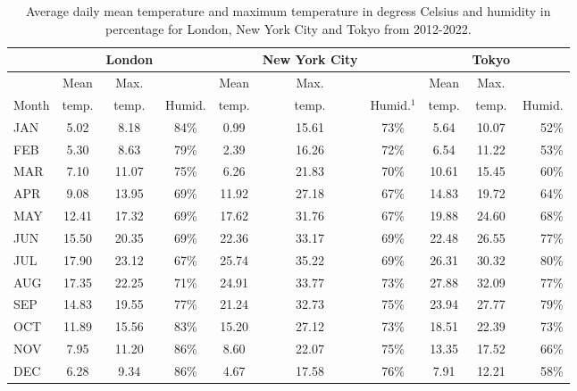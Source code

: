 \begin{table}[H]
\begin{adjustwidth}{-1in}{-1in} %
\small
\centering
\begin{tabular}{lccccccccr}
\toprule
{}  &  {} &  London &  {}  & {}  &  New York City  &  {}  & {}  &  Tokyo  & {}\\
\midrule
\multicolumn{1}{c|}{} &  Mean &  Max. &  \multicolumn{1}{c|}{} &  Mean &  Max. &  \multicolumn{1}{c|}{} &   Mean  &   Max. &  {} \\
\multicolumn{1}{c|}{Month} &  temp. &  temp. &  \multicolumn{1}{c|}{Humid.} &  temp. &  temp. &  \multicolumn{1}{c|}{Humid.$^1$} &   temp. &  temp. &  Humid. \\
\midrule
JAN &    5.02 &        8.18 &        84\% &    0.99 &      15.61 &      73\% &   5.64 &     10.07 &      52\% \\
FEB &    5.30 &        8.63 &        79\% &    2.39 &      16.26 &      72\% &   6.54 &     11.22 &      53\% \\
MAR &    7.10 &       11.07 &        75\% &    6.26 &      21.83 &      70\% &  10.61 &     15.45 &      60\% \\
APR &    9.08 &       13.95 &        69\% &   11.92 &      27.18 &      67\% &  14.83 &     19.72 &      64\% \\
MAY &   12.41 &       17.32 &        69\% &   17.62 &      31.76 &      67\% &  19.88 &     24.60 &      68\% \\
JUN &   15.50 &       20.35 &        69\% &   22.36 &      33.17 &      69\% &  22.48 &     26.55 &      77\% \\
JUL &   17.90 &       23.12 &        67\% &   25.74 &      35.22 &      69\% &  26.31 &     30.32 &      80\% \\
AUG &   17.35 &       22.25 &        71\% &   24.91 &      33.77 &      73\% &  27.88 &     32.09 &      77\% \\
SEP &   14.83 &       19.55 &        77\% &   21.24 &      32.73 &      75\% &  23.94 &     27.77 &      79\% \\
OCT &   11.89 &       15.56 &        83\% &   15.20 &      27.12 &      73\% &  18.51 &     22.39 &      73\% \\
NOV &    7.95 &       11.20 &        86\% &    8.60 &      22.07 &      75\% &  13.35 &     17.52 &      66\% \\
DEC &    6.28 &        9.34 &        86\% &    4.67 &      17.58 &      76\% &   7.91 &     12.21 &      58\% \\
\bottomrule
\end{tabular}
\end{adjustwidth}
\caption[Average temperature and humidity]{Average daily mean temperature and maximum temperature in degress Celsius and humidity in percentage for London, New York City and Tokyo from 2012-2022.}
\label{table:temp_humidity}
\end{table}

